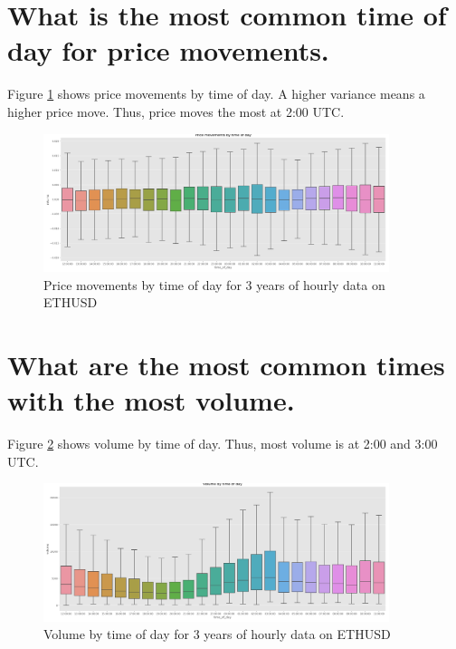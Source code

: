 \section{ What is the most common time of day for price movements.}

Figure \ref{fig:pm} shows price movements by time of day. A higher variance means a higher price move. Thus, price moves the most at 2:00 UTC.
\begin{figure}
\center
\includegraphics[width=0.9\textwidth]{fig/pm.png}
\caption{Price movements by time of day for 3 years of hourly data on ETHUSD}
\label{fig:pm}
\end{figure}
 
\section{ What are the most common times with the most volume.}
Figure \ref{fig:vol_times} shows volume by time of day. Thus, most volume is at 2:00 and 3:00 UTC.
\begin{figure}
\center
\includegraphics[width=0.9\textwidth]{fig/vol_times.png}
\caption{Volume by time of day for 3 years of hourly data on ETHUSD}
\label{fig:vol_times}
\end{figure}

